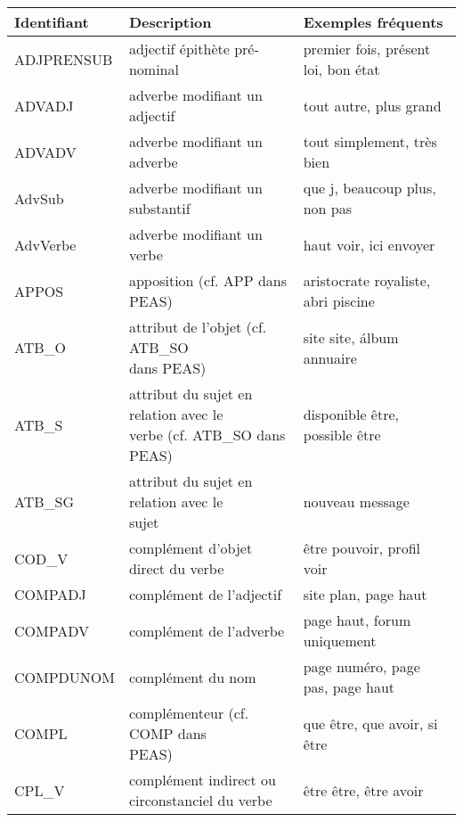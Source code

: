 \documentclass[oneside,parskip]{scrbook}
\makeatletter
\newcommand{\specialcell}[2][l]{%
      \begin{tabular}[#1]{@{}l@{}}#2\end{tabular}}
\makeatother
\begin{document}
\begin{longtable}{lll}
    \toprule
    Identifiant   & Description & Exemples fréquents \\ \midrule
    ADJPRENSUB    &  adjectif épithète pré-nominal         & premier fois, présent loi, bon état \\ \midrule
    ADVADJ        &  adverbe modifiant un adjectif         & tout autre, plus grand \\ \midrule
    ADVADV        &  adverbe modifiant un adverbe          & tout simplement, très bien \\ \midrule
    AdvSub        &  adverbe modifiant un substantif       & que j, beaucoup plus, non pas \\ \midrule
    AdvVerbe      &  adverbe modifiant un verbe            & haut voir, ici envoyer \\ \midrule
    APPOS         &  apposition (cf. APP dans PEAS)        & aristocrate royaliste, abri piscine \\ \midrule
    ATB\_O        &  \specialcell{attribut de l'objet (cf. ATB\_SO \\ dans PEAS)} & site site, álbum annuaire \\ \midrule
    ATB\_S        &  \specialcell{attribut du sujet en relation avec le \\ verbe (cf. ATB\_SO dans PEAS)} & disponible être, possible être \\ \midrule
    ATB\_SG       &  \specialcell{attribut du sujet en relation avec le \\ sujet} & nouveau message \\ \midrule
    COD\_V        &  complément d'objet direct du verbe    & être pouvoir,  profil voir \\ \midrule
    COMPADJ       &  complément de l'adjectif              & site plan, page haut \\ \midrule
    COMPADV       &  complément de l'adverbe               & page haut, forum uniquement \\ \midrule
    COMPDUNOM     &  complément du nom                     & page numéro, page pas, page haut \\ \midrule
    COMPL         &  \specialcell{complémenteur (cf. COMP dans \\ PEAS)} & que être, que avoir, si être \\ \midrule
    CPL\_V        &  \specialcell{complément indirect ou \\ circonstanciel du verbe } & être être, être avoir  \\ \midrule

\end{longtable}
\end{document}
